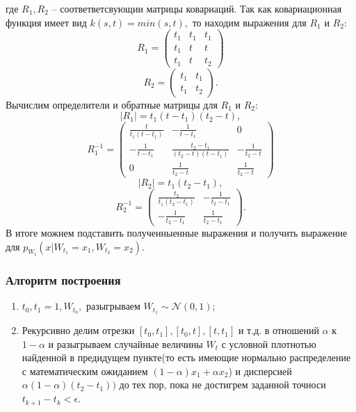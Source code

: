 \documentclass[11pt]{article}
\numberwithin{equation}{section}
\begin{document}
где $R_1, R_2$ -- соответветсвующии матрицы ковариаций. Так как ковариационная функция имеет вид $k(s,t) = min(s,t),$ то находим выражения для 
$R_1$ и $R_2$:
\begin{equation*}
  R_1 =
  \begin{pmatrix}
  t_1 & t_1 & t_1\\
  t_1 & t & t\\
  t_1 & t & t_2
  \end{pmatrix}
\end{equation*}
\begin{equation*}
  R_2=
  \begin{pmatrix}
  t_1 & t_1\\
  t_1 & t_2
  \end{pmatrix}.
\end{equation*}
Вычислим определители и обратные матрицы для $R_1$ и $R_2$:
$$|R_1| = t_1 (t-t_1)(t_2-t),$$
\begin{equation*}
  R_1^{-1} =
  \begin{pmatrix}
  \frac{t}{t_1(t-t_1)} & -\frac{1}{t-t_1} & 0\\
  -\frac{1}{t-t_1} & \frac{t_2-t_1}{(t_2-t)(t-t_1)} & -\frac{1}{t_2-t}\\
  0 & \frac{1}{t_2-t} & \frac{1}{t_2-t}
  \end{pmatrix}
\end{equation*}
$$|R_2| = t_1(t_2-t_1),$$
\begin{equation*}
  R_2^{-1}=
  \begin{pmatrix}
  \frac{t_2}{t_1(t_2-t_1)} & -\frac{1}{t_2-t_1}\\
  -\frac{1}{t_2-t_1} & \frac{1}{t_2-t_1}
  \end{pmatrix}.
\end{equation*}
В итоге можнем подставить полученныенные выражения и получить выражение для $p_{W_t} (x | W_{t_1} = x_1, W_{t_2} = x_2)$.
\subsubsection{Алгоритм построения}
\begin{enumerate}
  \item $t_0, t_1=1, W_{t_0},$ разыгрываем $W_{t_1} \sim \mathcal{N}(0,1);$
  \item Рекурсивно делим отрезки $[t_0,t_1], [t_0,t], [t, t_1]$ и т.д. в отношений $\alpha$ к $1-\alpha$
  и разыгрываем случайные величины $W_t$ с условной плотнотью найденной в предидущем пункте(то есть имеющие нормально распределение с математическим ожиданием $(1-\alpha)x_1 + \alpha x_2$)
  и дисперсией $\alpha(1-\alpha)(t_2-t_1))$ до тех пор, пока не достигрем заданной точноси $t_{k+1}-t_k < \epsilon.$
\end{enumerate}
\end{document}
